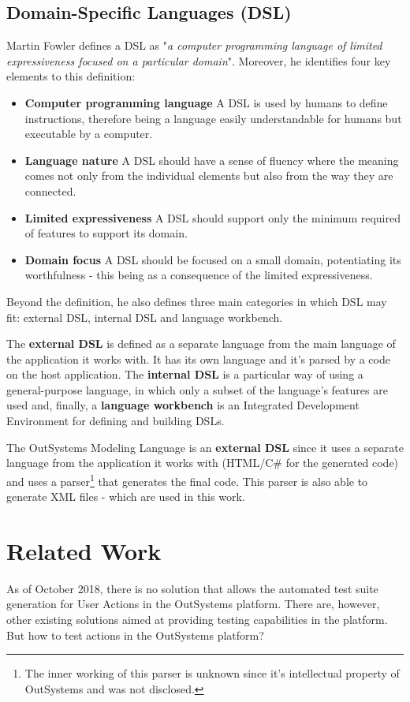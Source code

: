 \documentclass{sigchi}
\begin{document}
\subsection{Domain-Specific Languages (DSL)}
Martin Fowler defines a DSL as "\textit{a computer programming language of limited expressiveness focused on a particular domain}"\cite{Fowler:2010:DSL:1809745}. Moreover, he identifies four key elements to this definition:
\begin{itemize}
    \item \textbf{Computer programming language} A DSL is used by humans to define instructions, therefore being a language easily understandable for humans but executable by a computer.
    \item \textbf{Language nature} A DSL should have a sense of fluency where the meaning comes not only from the individual elements but also from the way they are connected.
    \item \textbf{Limited expressiveness} A DSL should support only the minimum required of features to support its domain.
    \item \textbf{Domain focus} A DSL should be focused on a small domain, potentiating its worthfulness - this being as a consequence of the limited expressiveness.
\end{itemize}

Beyond the definition, he also defines three main categories in which DSL may fit: external DSL, internal DSL and language workbench.

The \textbf{external DSL} is defined as a separate language from the main language of the application it works with. It has its own language and it's parsed by a code on the host application. The \textbf{internal DSL} is a particular way of using a general-purpose language, in which only a subset of the language's features are used and, finally, a \textbf{language workbench} is an Integrated Development Environment for defining and building DSLs.

The OutSystems Modeling Language is an \textbf{external DSL} since it uses a separate language from the application it works with (HTML/C\# for the generated code) and uses a parser\footnote{The inner working of this parser is unknown since it's intellectual property of OutSystems and was not disclosed.} that generates the final code. This parser is also able to generate XML files - which are used in this work.

\section{Related Work}
As of October 2018, there is no solution that allows the automated test suite generation for User Actions in the OutSystems platform. There are, however, other existing solutions aimed at providing testing capabilities in the platform. But how to test actions in the OutSystems platform?
\end{document}
